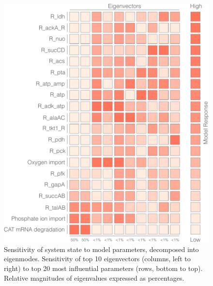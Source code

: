\documentclass[12pt]{article}
\begin{document}
\clearpage

\renewcommand\thefigure{S\arabic{figure}}
\renewcommand\thetable{T\arabic{table}}
\renewcommand\thepage{S-\arabic{page}}
\renewcommand\theequation{S\arabic{equation}}

\setcounter{equation}{0}
\setcounter{table}{0}
\setcounter{figure}{0}
\setcounter{page}{1}


\begin{figure}[ht]
\centering
\includegraphics[width=1.00\textwidth]{./Figures/Sens_state.pdf}
\caption{Sensitivity of system state to model parameters, decomposed into eigenmodes. Sensitivity of top 10 eigenvectors  (columns, left to right) to top 20 most influential parameters (rows, bottom to top). Relative magnitudes of eigenvalues expressed as percentages.}
\label{fig:Sensitivity-System}
\end{figure}
\end{document}
